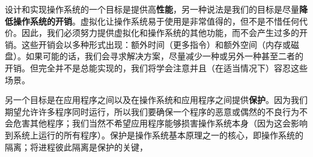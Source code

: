 设计和实现操作系统的一个目标是提供高\textbf{性能}，另一种说法是我们的目标是尽量\textbf{降低操作系统的开销}。虚拟化让操作系统易于使用是非常值得的，但不是不惜任何代价。因此，我们必须努力提供虚拟化和操作系统的其他功能，而不会产生过多的开销。这些开销会以多种形式出现：额外时间（更多指令）和额外空间（内存或磁盘）。如果可能的话，我们会寻求解决方案，尽量减少一种或另外一种甚至二者的开销。但完全并不是总能实现的，我们将学会注意并且（在适当情况下）容忍这些场景。

另一个目标是在应用程序之间以及在操作系统和应用程序之间提供\textbf{保护}。因为我们期望允许许多程序同时运行，所以我们要确保一个程序的恶意或偶然的不良行为不会危害其他程序；我们当然不希望应用程序能够损害操作系统本身（因为这会影响到系统上运行的所有程序）。保护是操作系统基本原理之一的核心，即操作系统的隔离；将进程彼此隔离是保护的关键，